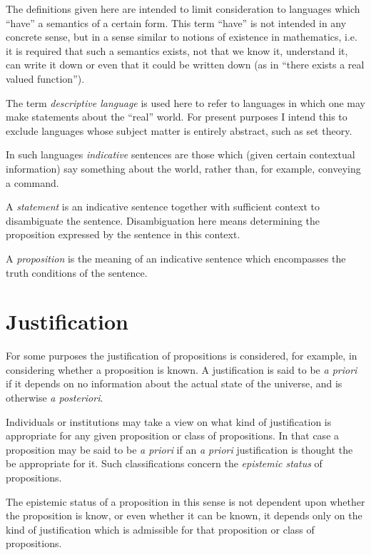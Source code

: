 The definitions given here are intended to limit consideration to languages which ``have'' a semantics of a certain form.
This term ``have'' is not intended in any concrete sense, but in a sense similar to notions of existence in mathematics, i.e. it is required that such a semantics exists, not that we know it, understand it, can write it down or even that it could be written down (as in ``there exists a real valued function'').

The term {\it descriptive language} is used here to refer to languages in which one may make statements about the ``real'' world.
For present purposes I intend this to exclude languages whose subject matter is entirely abstract, such as set theory.

In such languages {\it indicative} sentences are those which (given certain contextual information) say something about the world, rather than, for example, conveying a command.

A {\it statement} is an indicative sentence together with sufficient context to disambiguate the sentence.
Disambiguation here means determining the proposition expressed by the sentence in this context.

A {\it proposition} is the meaning of an indicative sentence which encompasses the truth conditions of the sentence.

\section{Justification}

For some purposes the justification of propositions is considered, for example, in considering whether a proposition is known.
A justification is said to be {\it a priori} if it depends on no information about the actual state of the universe, and is otherwise {\it a posteriori}.

Individuals or institutions may take a view on what kind of justification is appropriate for any given proposition or class of propositions.
In that case a proposition may be said to be {\it a priori} if an {\it a priori} justification is thought the be appropriate for it.
Such classifications concern the {\it epistemic status} of propositions.

The epistemic status of a proposition in this sense is not dependent upon whether the proposition is know, or even whether it can be known, it depends only on the kind of justification which is admissible for that proposition or class of propositions.

